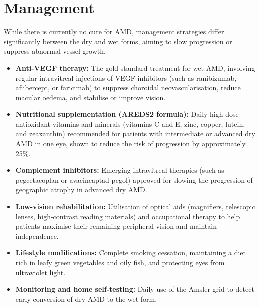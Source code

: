 \section*{Management}
While there is currently no cure for AMD, management strategies differ significantly between the dry and wet forms, aiming to slow progression or suppress abnormal vessel growth.
\begin{itemize}
    \item \textbf{Anti-VEGF therapy:} The gold standard treatment for wet AMD, involving regular intravitreal injections of VEGF inhibitors (such as ranibizumab, aflibercept, or faricimab) to suppress choroidal neovascularisation, reduce macular oedema, and stabilise or improve vision.
    \item \textbf{Nutritional supplementation (AREDS2 formula):} Daily high-dose antioxidant vitamins and minerals (vitamins C and E, zinc, copper, lutein, and zeaxanthin) recommended for patients with intermediate or advanced dry AMD in one eye, shown to reduce the risk of progression by approximately 25\%.
    \item \textbf{Complement inhibitors:} Emerging intravitreal therapies (such as pegcetacoplan or avacincaptad pegol) approved for slowing the progression of geographic atrophy in advanced dry AMD.
    \item \textbf{Low-vision rehabilitation:} Utilisation of optical aids (magnifiers, telescopic lenses, high-contrast reading materials) and occupational therapy to help patients maximise their remaining peripheral vision and maintain independence.
    \item \textbf{Lifestyle modifications:} Complete smoking cessation, maintaining a diet rich in leafy green vegetables and oily fish, and protecting eyes from ultraviolet light.
    \item \textbf{Monitoring and home self-testing:} Daily use of the Amsler grid to detect early conversion of dry AMD to the wet form.
\end{itemize}

